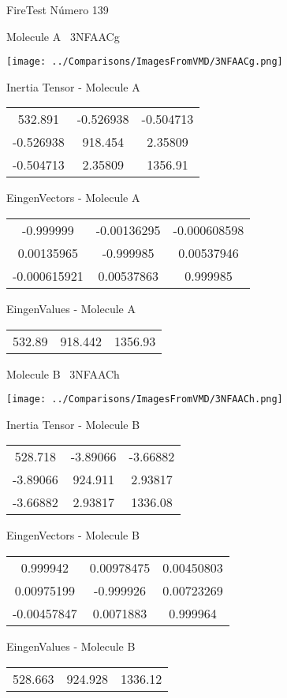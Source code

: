 \vtab[-3cm]
\begin{center}
{\large FireTest \tab Número 139}
\end{center}
\begin{multicols}{2}
\begin{center}

Molecule A \
3NFAACg

\texttt{[image: ../Comparisons/ImagesFromVMD/3NFAACg.png]}

Inertia Tensor - Molecule A \\
\begin{tabular}{|c c c|}
532.891	 & 	-0.526938	 & 	-0.504713	 \\
-0.526938	 & 	918.454	 & 	2.35809	 \\
-0.504713	 & 	2.35809	 & 	1356.91
\end{tabular}

\vtab
 EingenVectors - Molecule A     \\
\begin{tabular}{|c c c|}
-0.999999	 & 	-0.00136295	 & 	-0.000608598	 \\
0.00135965	 & 	-0.999985	 & 	0.00537946	 \\
-0.000615921	 & 	0.00537863	 & 	0.999985
\end{tabular}

\vtab
 EingenValues - Molecule A     \\
\begin{tabular}{|c c c|}
532.89	 & 	918.442	 & 	1356.93	 \\
\end{tabular}
\columnbreak

Molecule B \
3NFAACh

\texttt{[image: ../Comparisons/ImagesFromVMD/3NFAACh.png]}

Inertia Tensor - Molecule B \\
\begin{tabular}{|c c c|}
528.718	 & 	-3.89066	 & 	-3.66882	 \\
-3.89066	 & 	924.911	 & 	2.93817	 \\
-3.66882	 & 	2.93817	 & 	1336.08
\end{tabular}

\vtab
 EingenVectors - Molecule B     \\
\begin{tabular}{|c c c|}
0.999942	 & 	0.00978475	 & 	0.00450803	 \\
0.00975199	 & 	-0.999926	 & 	0.00723269	 \\
-0.00457847	 & 	0.0071883	 & 	0.999964
\end{tabular}

\vtab
 EingenValues - Molecule B     \\
\begin{tabular}{|c c c|}
528.663	 & 	924.928	 & 	1336.12	 \\
\end{tabular}

\end{center}
\end{multicols}

